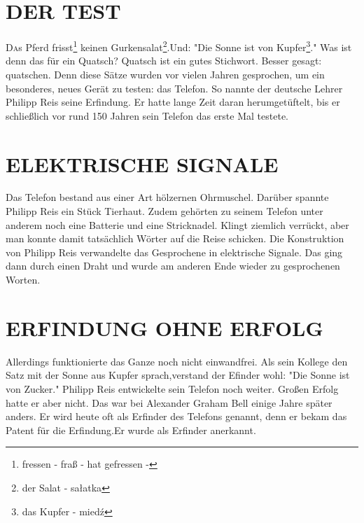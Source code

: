 \documentclass[twoside]{article}
\begin{document}
\begin{multicols}{2} %

\section{DER TEST}

\lettrine[nindent=0em,lines=3]{D}as Pferd frisst\footnote{fressen - fra{\ss} - hat gefressen - }
keinen Gurkensalat\footnote{der Salat - sa\l{}atka}.Und: "Die Sonne ist von Kupfer\footnote{das Kupfer - mied\'z}." Was ist denn das f\"ur ein Quatsch?
 Quatsch ist ein gutes Stichwort. Besser gesagt: quatschen.
 Denn diese S\"atze wurden vor vielen Jahren gesprochen,
 um ein besonderes, neues Ger\"at zu testen: das Telefon.
 So nannte der deutsche Lehrer Philipp Reis seine Erfindung.
 Er hatte lange Zeit daran herumget\"uftelt, bis er schlie{\ss}lich
 vor rund 150 Jahren sein Telefon das erste Mal testete.


\section{ELEKTRISCHE SIGNALE}

Das Telefon bestand aus einer Art h\"olzernen Ohrmuschel. Dar\"uber
 spannte Philipp Reis ein St\"uck Tierhaut. Zudem geh\"orten zu seinem
 Telefon unter anderem noch eine Batterie und eine Stricknadel. Klingt
 ziemlich verr\"uckt, aber man konnte damit tats\"achlich W\"orter
 auf die Reise schicken. Die Konstruktion von Philipp Reis verwandelte
 das Gesprochene in elektrische Signale. Das ging dann durch einen
 Draht und wurde am anderen Ende wieder zu gesprochenen Worten.


\section{ERFINDUNG OHNE ERFOLG}

Allerdings funktionierte das Ganze noch nicht einwandfrei. Als sein
 Kollege den Satz mit der Sonne aus Kupfer sprach,verstand der Efinder
 wohl: "Die Sonne ist von Zucker." Philipp Reis entwickelte sein Telefon
 noch weiter. Gro{\ss}en Erfolg hatte er aber nicht. Das war bei Alexander
 Graham Bell einige Jahre sp\"ater anders. Er wird heute oft als Erfinder
 des Telefons genannt, denn er bekam das Patent f\"ur die Erfindung.Er wurde
 als Erfinder anerkannt.


\end{multicols}
\end{document}
